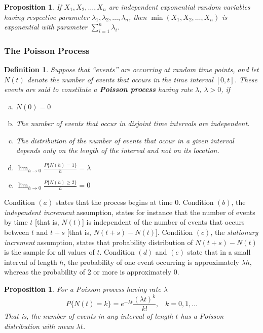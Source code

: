 \documentclass[12pt]{article}
\newtheorem{definition}[theorem]{Definition}
\newtheorem{proposition}[theorem]{Proposition}
\begin{document}
\begin{proposition}
  If $X_1,X_2,\dots,X_n$ are independent exponential random variables having respective parameter $\lambda_1, \lambda_2, \dots, \lambda_n$, then $\min(X_1, X_2,\dots,X_n)$ is exponential with parameter $\sum_{i=1}^n \lambda_i$.
\end{proposition}

\subsubsection{The Poisson Process}

\begin{definition}
  Suppose that ``events'' are occurring at random time points, and let $N(t)$ denote the number of events that occurs in the time interval $[0,t]$. These events are said to constitute a \textbf{Poisson process} having rate $\lambda$, $\lambda > 0$, if
  \begin{enumerate} [(a)]
    \item $N(0) = 0$
    \item The number of events that occur in disjoint time intervals are independent.
    \item The distribution of the number of events that occur in a given interval depends only on the length of the interval and not on its location.
    \item $\lim_{h \rightarrow 0} \frac {P\{ N(h) = 1 \} }{h} = \lambda$
    \item $\lim_{h \rightarrow 0} \frac {P\{ N(h) \ge 2 \} }{h} = 0$
  \end{enumerate}
\end{definition}

Condition $(a)$ states that the process begins at time 0. Condition $(b)$, the \emph{independent increment} assumption, states for instance that the number of events by time $t$ [that is, $N(t)$] is independent of the number of events that occurs between $t$ and $t+s$ [that is, $N(t+s) - N(t)$]. Condition $(c)$,  the \emph{stationary increment} assumption, states that probability distribution of $N(t+s) - N(t)$ is the sample for all values of $t$. Condition $(d)$ and $(e)$ state that in a small interval of length $h$, the probability of one event occurring is approximately $\lambda h$, whereas the probability of 2 or more is approximately 0. \\

\begin{proposition}
  For a Poisson process having rate $\lambda$
  \begin{equation*}
    P\{ N(t)=k \} = e^{-\lambda t} \frac{(\lambda t)^k}{k!}, \;\;\; k=0,1,\dots
  \end{equation*}
  That is, the number of events in any interval of length $t$ has a Poisson distribution with mean $\lambda t$.
\end{proposition}
\end{document}
